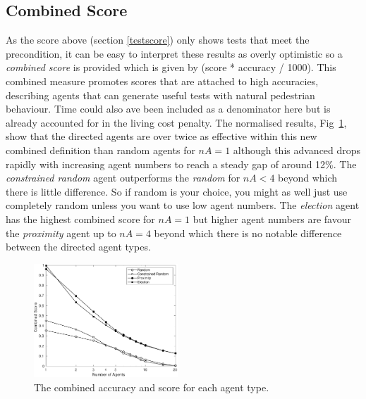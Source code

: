 \documentclass[letterpaper, 10 pt, journal, twoside]{IEEEtran}
\begin{document}
\subsection{Combined Score}
As the score above (section \ref{testscore}) only shows tests that meet the precondition, it can be easy to interpret these results as overly optimistic so a \textit{combined score} is provided which is given by (score * accuracy / 1000). This combined measure promotes scores that are attached to high accuracies, describing agents that can generate useful tests with natural pedestrian behaviour. Time could also ave been included as a denominator here but is already accounted for in the living cost penalty. %
%
The normalised results, Fig~\ref{Combined}, show that the directed agents are over twice as effective within this new combined definition than random agents for $nA=1$ although this advanced drops rapidly with increasing agent numbers to reach a steady gap of around 12\%.
%
The \textit{constrained random} agent outperforms the \textit{random} for $nA<4$ beyond which there is little difference. So if random is your choice, you might as well just use completely random unless you want to use low agent numbers. %
%
The \textit{election} agent has the highest combined score for $nA=1$ but higher agent numbers are favour the \textit{proximity} agent up to $nA=4$ beyond which there is no notable difference between the directed agent types. %
%

\begin{figure}[!t]
	\centering
\includegraphics[width=0.48\textwidth]{Combined.pdf}
	\caption{The combined accuracy and score for each agent type.}
	\label{Combined}
\end{figure}



\end{document}
